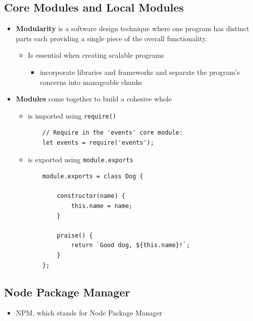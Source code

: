\documentclass[12pt]{article}
\begin{document}
\subsection{Core Modules and Local Modules}
\begin{itemize}
    \item \textbf{Modularity} is a software design technique where one program has distinct parts each providing a single piece of the overall functionality.
    \begin{itemize}
        \item Is essential when creating scalable programs
        \begin{itemize}
            \item incorporate libraries and frameworks and separate the program’s concerns into manageable chunks
        \end{itemize}
    \end{itemize}
    \item \textbf{Modules} come together to build a cohesive whole
    \begin{itemize}
        \item is imported using \texttt{require()}

    \begin{lstlisting}
    // Require in the 'events' core module:
    let events = require('events');
    \end{lstlisting}

        \item is exported using \texttt{module.exports}

    \begin{lstlisting}
    module.exports = class Dog {

        constructor(name) {
            this.name = name;
        }

        praise() {
            return `Good dog, ${this.name}!`;
        }
    };
    \end{lstlisting}
    \end{itemize}
\end{itemize}

\subsection{Node Package Manager}
\begin{itemize}
    \item NPM, which stands for Node Package Manager
\end{itemize}
\end{document}

